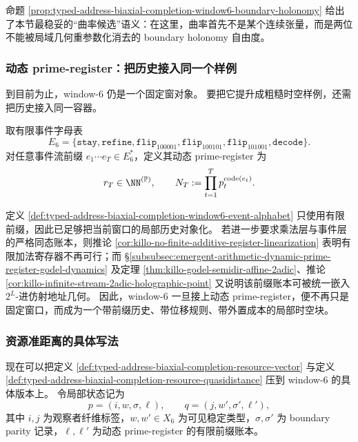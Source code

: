 命题 \ref{prop:typed-address-biaxial-completion-window6-boundary-holonomy} 给出了本节最稳妥的“曲率候选”语义：在这里，曲率首先不是某个连续张量，而是两位不能被局域几何重参数化消去的 boundary holonomy 自由度。

\subsubsection{动态 prime-register：把历史接入同一个样例}\label{subsubsec:typed-address-biaxial-completion-window6-dynamic-ledger}
到目前为止，window-\(6\) 仍是一个固定窗对象。
要把它提升成粗糙时空样例，还需把历史接入同一容器。

\begin{definition}\label{def:typed-address-biaxial-completion-window6-event-alphabet}
取有限事件字母表
\[
E_6=
\{
\mathtt{stay},
\mathtt{refine},
\mathtt{flip}_{100001},
\mathtt{flip}_{100101},
\mathtt{flip}_{101001},
\mathtt{decode}
\}.
\]
对任意事件流前缀 \(e_1\cdots e_T\in E_6^\ast\)，定义其动态 prime-register 为
\[
r_T\in \NN^{(\mathbb P)},
\qquad
N_T:=\prod_{t=1}^{T}p_t^{\mathrm{code}(e_t)}.
\]
\end{definition}

\begin{remark}\label{rem:typed-address-biaxial-completion-window6-dynamic-ledger}
定义 \ref{def:typed-address-biaxial-completion-window6-event-alphabet} 只使用有限前缀，因此已足够把当前窗口的局部历史对象化。
若进一步要求乘法层与事件层的严格同态账本，则推论 \ref{cor:killo-no-finite-additive-register-linearization} 表明有限加法寄存器不再可行；而 \S\ref{subsubsec:emergent-arithmetic-dynamic-prime-register-godel-dynamics} 及定理 \ref{thm:killo-godel-semidir-affine-2adic}、推论 \ref{cor:killo-infinite-stream-2adic-holographic-point} 又说明该前缀账本可被统一嵌入 \(2^L\)-进仿射地址几何。
因此，window-\(6\) 一旦接上动态 prime-register，便不再只是固定窗口，而成为一个带前缀历史、带位移规则、带外置成本的局部时空块。
\end{remark}

\subsubsection{资源准距离的具体写法}\label{subsubsec:typed-address-biaxial-completion-window6-resource-distance}
现在可以把定义 \ref{def:typed-address-biaxial-completion-resource-vector} 与定义 \ref{def:typed-address-biaxial-completion-resource-quasidistance} 压到 window-\(6\) 的具体版本上。
令局部状态记为
\[
p=(i,w,\sigma,\ell),
\qquad
q=(j,w',\sigma',\ell'),
\]
其中 \(i,j\) 为观察者纤维标签，\(w,w'\in X_6\) 为可见稳定类型，\(\sigma,\sigma'\) 为 boundary parity 记录，\(\ell,\ell'\) 为动态 prime-register 的有限前缀账本。

